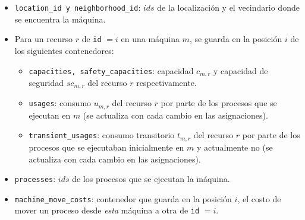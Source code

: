 \documentclass[../informe2.tex]{subfiles}
\begin{document}
\noindent\begin{minipage}{0.4\textwidth}
\end{minipage}\hfill
\begin{minipage}{0.55\textwidth}
	\small
	\begin{itemize}[leftmargin=*]
		\item \texttt{location\_id y neighborhood\_id}: $ids$ de la localización y el vecindario donde se encuentra la máquina.
		\item Para un recurso $r$ de \texttt{id}  $=i$ en una máquina $m$, se guarda en la posición $i$ de los siguientes contenedores:
		\begin{itemize}
			\item \texttt{capacities, safety\_capacities}: capacidad $c_{m,r}$ y capacidad de seguridad $sc_{m,r}$ del recurso $r$ respectivamente.
			\item \texttt{usages}: consumo $u_{m,r}$ del recurso $r$ por parte de los procesos que se ejecutan en $m$ (se actualiza con cada cambio en las asignaciones).
			\item \texttt{transient\_usages}: consumo transitorio $t_{m,r}$ del recurso $r$ por parte de los procesos que se ejecutaban inicialmente en $m$ y actualmente no (se actualiza con cada cambio en las asignaciones).
		\end{itemize}
		\item \texttt{processes}: $ids$ de los procesos que se ejecutan la máquina.
		\item \texttt{machine\_move\_costs}: contenedor que guarda en la posición $i$, el costo de mover un proceso desde \textit{esta} máquina a otra de \texttt{id} $=i$.
	\end{itemize}
\end{minipage}

\vspace{0.75cm}
\end{document}
